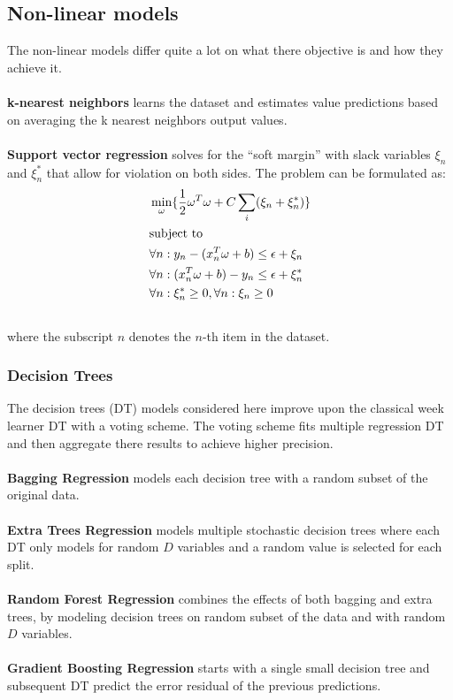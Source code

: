 \documentclass[a4paper]{article}
\begin{document}
\subsection{Non-linear models}
The non-linear models differ quite a lot on what there objective is and how they achieve it. \\\\
\textbf{k-nearest neighbors} learns the dataset and estimates value predictions based on averaging the k nearest neighbors output values. \\\\
\textbf{Support vector regression} solves for the “soft margin” with slack variables $\xi_n$ and $\xi_n^*$ that allow for violation on both sides. The problem can be formulated as:
\begin{align} \label{eq:5}
    &\min_{\omega} \{\frac{1}{2}\omega^T\omega + C\sum_i(\xi_n + \xi_n^*)\} \notag \\
&\text{subject to} \notag \\
    & \forall n : y_n - (x_n^T\omega + b) \leq \epsilon + \xi_n \notag \\
    & \forall n : (x_n^T\omega + b) - y_n\leq \epsilon + \xi_n^* \notag \\
    & \forall n : \xi_n^* \geq 0, \forall n : \xi_n \geq 0 \notag \\ \notag
\end{align} %
where the subscript $n$ denotes the $n$-th item in the dataset.
\subsubsection{Decision Trees}
The decision trees (DT) models considered here improve upon the classical week learner DT with a voting scheme. The voting scheme fits multiple regression DT and then aggregate there results to achieve higher precision. \\\\
\textbf{Bagging Regression} models each decision tree with a random subset of the original data. \\\\
\textbf{Extra Trees Regression} models multiple stochastic decision trees where each DT only models for random $D$ variables and a random value is selected for each split. \\\\
\textbf{Random Forest Regression} combines the effects of both bagging and extra trees, by modeling decision trees on random subset of the data and with random $D$ variables. \\\\
\textbf{Gradient Boosting Regression} starts with a single small decision tree and subsequent DT predict the error residual of the previous predictions.
\end{document}
